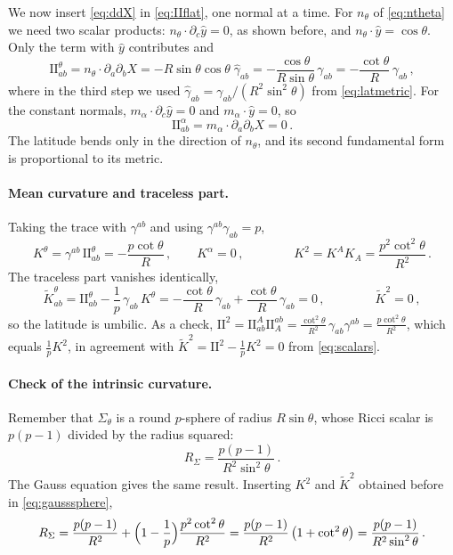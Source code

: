\documentclass[a4paper,11pt]{article}
\newcommand{\II}{\mathrm{I\!I}}
\newcommand{\Kt}{\widetilde{K}}
\begin{document}
We now insert \eqref{eq:ddX} in \eqref{eq:IIflat}, one normal at a time. For $n_\theta$ of \eqref{eq:ntheta} we need two scalar products: $n_\theta\cdot\partial_c\hat y=0$, as shown before, and $n_\theta\cdot\hat y=\cos\theta$. Only the term with $\hat y$ contributes and
\begin{equation}
	\II^\theta_{ab}=n_\theta\cdot\partial_a\partial_bX=-R\sin\theta\cos\theta\;\hat\gamma_{ab}=-\frac{\cos\theta}{R\sin\theta}\,\gamma_{ab}=-\frac{\cot\theta}{R}\,\gamma_{ab}\, ,
\end{equation}
where in the third step we used $\hat\gamma_{ab}=\gamma_{ab}/(R^2\sin^2\theta)$ from \eqref{eq:latmetric}. For the constant normals, $m_\alpha\cdot\partial_c\hat y=0$ and $m_\alpha\cdot\hat y=0$, so
\begin{equation}
	\II^{\alpha}_{ab}=m_\alpha\cdot\partial_a\partial_bX=0\, .
\end{equation}
The latitude bends only in the direction of $n_\theta$, and its second fundamental form is proportional to its metric.

\paragraph{Mean curvature and traceless part.}
Taking the trace with $\gamma^{ab}$ and using $\gamma^{ab}\gamma_{ab}=p$,
\begin{equation}
	K^\theta=\gamma^{ab}\,\II^\theta_{ab}=-\frac{p\cot\theta}{R}\, ,\qquad K^\alpha=0\, ,\qquad\qquad K^2=K^AK_A=\frac{p^2\cot^2\theta}{R^2}\, .
\end{equation}
The traceless part vanishes identically,
\begin{equation}
	\Kt^\theta_{ab}=\II^\theta_{ab}-\frac1p\,\gamma_{ab}\,K^\theta=-\frac{\cot\theta}{R}\,\gamma_{ab}+\frac{\cot\theta}{R}\,\gamma_{ab}=0\, ,\qquad\qquad \Kt^2=0\, ,
\end{equation}
so the latitude is umbilic. As a check, $\II^2=\II^A_{ab}\II_A^{ab}=\tfrac{\cot^2\theta}{R^2}\,\gamma_{ab}\gamma^{ab}=\tfrac{p\cot^2\theta}{R^2}$, which equals $\tfrac1pK^2$, in agreement with $\Kt^2=\II^2-\tfrac1pK^2=0$ from \eqref{eq:scalars}.

\paragraph{Check of the intrinsic curvature.}
Remember that $\Sigma_\theta$ is a round $p$-sphere of radius $R\sin\theta$, whose Ricci scalar is $p(p-1)$ divided by the radius squared:
\begin{equation}
	R_\Sigma=\frac{p(p-1)}{R^2\sin^2\theta}\, .
\end{equation}
The Gauss equation gives the same result. Inserting $K^2$ and $\Kt^2$ obtained before in \eqref{eq:gausssphere},
\begin{equation}
	R_\Sigma=\frac{p(p-1)}{R^2}+\Bigl(1-\frac1p\Bigr)\frac{p^2\cot^2\theta}{R^2}=\frac{p(p-1)}{R^2}\,\bigl(1+\cot^2\theta\bigr)=\frac{p(p-1)}{R^2\sin^2\theta}\, .
\end{equation}
\end{document}
